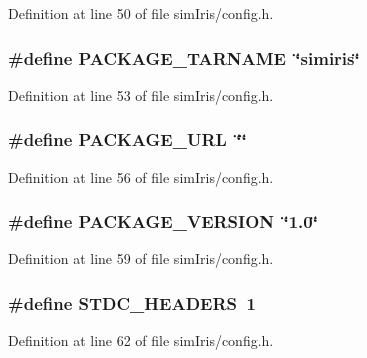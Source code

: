 Definition at line 50 of file simIris/config.h.
\subsubsection[{PACKAGE\_\-TARNAME}]{\setlength{\rightskip}{0pt plus 5cm}\#define PACKAGE\_\-TARNAME~\char`\"{}simiris\char`\"{}}\label{simIris_2config_8h_f415af6bfede0e8d5453708afe68651c}




Definition at line 53 of file simIris/config.h.
\subsubsection[{PACKAGE\_\-URL}]{\setlength{\rightskip}{0pt plus 5cm}\#define PACKAGE\_\-URL~\char`\"{}\char`\"{}}\label{simIris_2config_8h_5c93853116d5a50307b6744f147840aa}




Definition at line 56 of file simIris/config.h.
\subsubsection[{PACKAGE\_\-VERSION}]{\setlength{\rightskip}{0pt plus 5cm}\#define PACKAGE\_\-VERSION~\char`\"{}1.0\char`\"{}}\label{simIris_2config_8h_a326a05d5e30f9e9a4bb0b4469d5d0c0}




Definition at line 59 of file simIris/config.h.
\subsubsection[{STDC\_\-HEADERS}]{\setlength{\rightskip}{0pt plus 5cm}\#define STDC\_\-HEADERS~1}\label{simIris_2config_8h_550e5c272cc3cf3814651721167dcd23}




Definition at line 62 of file simIris/config.h.